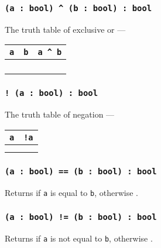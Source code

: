 \subsubsection{\texttt{(a : bool) ^ (b : bool) : bool}}

The truth table of exclusive or —

\begin{table}[H]
	\begin{tabular}{|c|c|c|}
		\hline
		\texttt{a} & \texttt{b} & \texttt{a ^ b} \\ \hline
		\false{} & \false{} & \false{} \\ \hline
		\false{} & \true{}  & \true{}  \\ \hline
		\true{}  & \false{} & \true{}  \\ \hline
		\true{}  & \true{}  & \false{} \\ \hline
	\end{tabular}
\end{table}

\subsubsection{\texttt{! (a : bool) : bool}}

The truth table of negation —

\begin{table}[H]
	\begin{tabular}{|c|c|}
		\hline
		\texttt{a} & \texttt{!a} \\ \hline
		\false{} &  \true{} \\ \hline
		\true{}  & \false{} \\ \hline
	\end{tabular}
\end{table}

\subsubsection{\texttt{(a : bool) == (b : bool) : bool}}

Returns \true{} if \texttt{a} is equal to \texttt{b}, otherwise \false{}.

\subsubsection{\texttt{(a : bool) != (b : bool) : bool}}

Returns \true{} if \texttt{a} is not equal to \texttt{b}, otherwise \false{}.

